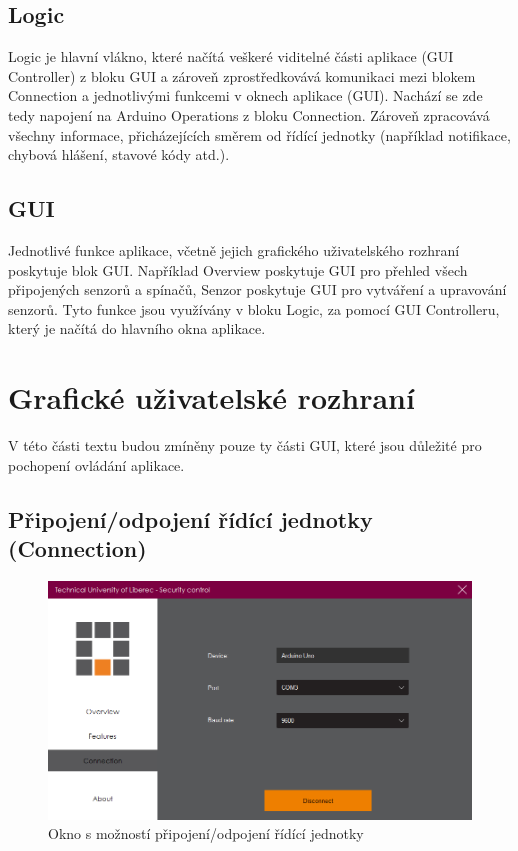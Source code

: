 \documentclass[FM,DP]{tulthesis}  %
\begin{document}
\subsection{Logic}
Logic je hlavní vlákno, které načítá veškeré viditelné části aplikace (GUI Controller) z bloku GUI a zároveň zprostředkovává komunikaci mezi blokem Connection a jednotlivými funkcemi v oknech aplikace (GUI). Nachází se zde tedy napojení na Arduino Operations z bloku Connection. Zároveň zpracovává všechny informace, přicházejících směrem od řídící jednotky (například notifikace, chybová hlášení, stavové kódy atd.).

\subsection{GUI}
Jednotlivé funkce aplikace, včetně jejich grafického uživatelského rozhraní poskytuje blok GUI. Například Overview poskytuje GUI pro přehled všech připojených senzorů a spínačů, Senzor poskytuje GUI pro vytváření a upravování senzorů. Tyto funkce jsou využívány v bloku Logic, za pomocí GUI Controlleru, který je načítá do hlavního okna aplikace.

\section{Grafické uživatelské rozhraní}
V této části textu budou zmíněny pouze ty části GUI, které jsou důležité pro pochopení ovládání aplikace.

\subsection{Připojení/odpojení řídící jednotky (Connection)}

\begin{figure}[H]
\begin{center}
\includegraphics[width=\textwidth]{images/connection.png}
\caption{Okno s možností připojení/odpojení řídící jednotky}
\label{image}
\end{center}
\end{figure}
\end{document}
